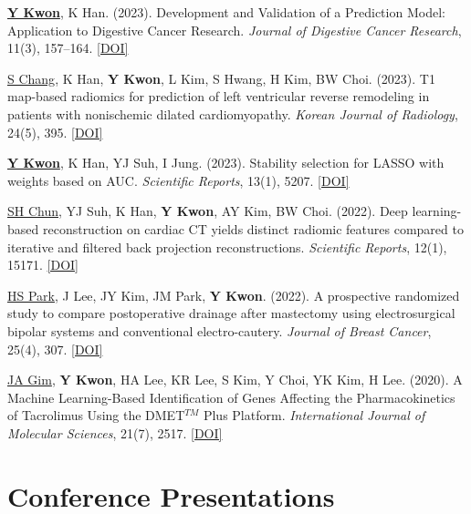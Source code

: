 \documentclass[10pt,a4paper]{article}
\newenvironment{publist}{%
    \renewcommand{\labelenumi}{\color{headercolor}[\theenumi]}%
    \begin{etaremune}[itemsep=0.3em]%
}{\end{etaremune}}
\begin{document}
\begin{publist}
    \item \underline{\textbf{Y Kwon}}, K Han. (2023).
    Development and Validation of a Prediction Model: Application to Digestive Cancer Research.
    \textit{Journal of Digestive Cancer Research}, 11(3), 157--164. \href{https://doi.org/10.52927/jdcr.2023.11.3.157}{[DOI]}

    \item \underline{S Chang}, K Han, \textbf{Y Kwon}, L Kim, S Hwang, H Kim, BW Choi. (2023).
    T1 map-based radiomics for prediction of left ventricular reverse remodeling in patients with nonischemic dilated cardiomyopathy.
    \textit{Korean Journal of Radiology}, 24(5), 395. \href{https://doi.org/10.3348/kjr.2023.0065}{[DOI]}

    \item \underline{\textbf{Y Kwon}}, K Han, YJ Suh, I Jung. (2023).
    Stability selection for LASSO with weights based on AUC.
    \textit{Scientific Reports}, 13(1), 5207. \href{https://doi.org/10.1038/s41598-023-32517-4}{[DOI]}

    \item \underline{SH Chun}, YJ Suh, K Han, \textbf{Y Kwon}, AY Kim, BW Choi. (2022).
    Deep learning-based reconstruction on cardiac CT yields distinct radiomic features compared to iterative and filtered back projection reconstructions.
    \textit{Scientific Reports}, 12(1), 15171. \href{https://doi.org/10.1038/s41598-022-19546-1}{[DOI]}

    \item \underline{HS Park}, J Lee, JY Kim, JM Park, \textbf{Y Kwon}. (2022).
    A prospective randomized study to compare postoperative drainage after mastectomy using electrosurgical bipolar systems and conventional electro-cautery.
    \textit{Journal of Breast Cancer}, 25(4), 307. \href{https://doi.org/10.4048/jbc.2022.25.e29}{[DOI]}

    \item \underline{JA Gim}, \textbf{Y Kwon}, HA Lee, KR Lee, S Kim, Y Choi, YK Kim, H Lee. (2020).
    A Machine Learning-Based Identification of Genes Affecting the Pharmacokinetics of Tacrolimus Using the DMET$^{TM}$ Plus Platform.
    \textit{International Journal of Molecular Sciences}, 21(7), 2517. \href{https://doi.org/10.3390/ijms21072517}{[DOI]}
\end{publist}

\section*{Conference Presentations}
\end{document}
